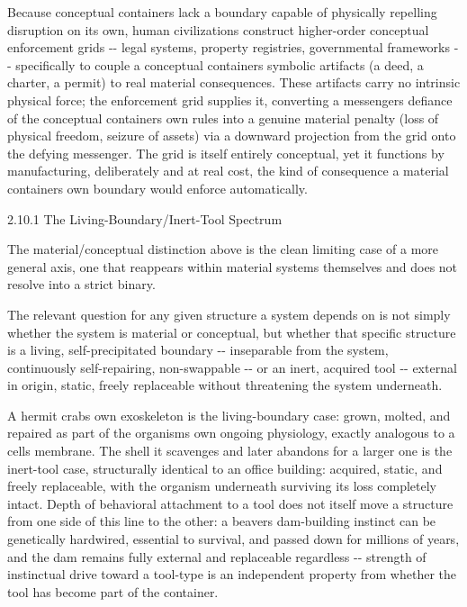 \documentclass[
]{article}
\begin{document}
Because conceptual containers lack a boundary capable of physically
repelling disruption on its own, human civilizations construct
higher-order conceptual enforcement grids -\/- legal systems, property
registries, governmental frameworks -\/- specifically to couple a
conceptual containers symbolic artifacts (a deed, a charter, a permit)
to real material consequences. These artifacts carry no intrinsic
physical force; the enforcement grid supplies it, converting a
messengers defiance of the conceptual containers own rules into a
genuine material penalty (loss of physical freedom, seizure of assets)
via a downward projection from the grid onto the defying messenger. The
grid is itself entirely conceptual, yet it functions by manufacturing,
deliberately and at real cost, the kind of consequence a material
containers own boundary would enforce automatically.

2.10.1 The Living-Boundary/Inert-Tool Spectrum

The material/conceptual distinction above is the clean limiting case of
a more general axis, one that reappears within material systems
themselves and does not resolve into a strict binary.

The relevant question for any given structure a system depends on is not
simply whether the system is material or conceptual, but whether that
specific structure is a living, self-precipitated boundary -\/-
inseparable from the system, continuously self-repairing, non-swappable
-\/- or an inert, acquired tool -\/- external in origin, static, freely
replaceable without threatening the system underneath.

A hermit crabs own exoskeleton is the living-boundary case: grown,
molted, and repaired as part of the organisms own ongoing physiology,
exactly analogous to a cells membrane. The shell it scavenges and later
abandons for a larger one is the inert-tool case, structurally identical
to an office building: acquired, static, and freely replaceable, with
the organism underneath surviving its loss completely intact. Depth of
behavioral attachment to a tool does not itself move a structure from
one side of this line to the other: a beavers dam-building instinct can
be genetically hardwired, essential to survival, and passed down for
millions of years, and the dam remains fully external and replaceable
regardless -\/- strength of instinctual drive toward a tool-type is an
independent property from whether the tool has become part of the
container.
\end{document}
